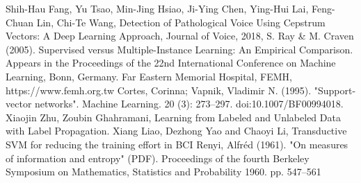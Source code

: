 \documentclass[conference]{IEEEtran}
\begin{document}
\begin{thebibliography}{00}
Shih-Hau Fang, Yu Tsao, Min-Jing Hsiao, Ji-Ying Chen, Ying-Hui Lai, Feng-Chuan Lin, Chi-Te Wang,
Detection of Pathological Voice Using Cepstrum Vectors: A Deep Learning Approach,
Journal of Voice, 2018,
S. Ray \& M. Craven (2005).
Supervised versus Multiple-Instance Learning: An Empirical Comparison.
Appears in the Proceedings of the 22nd International Conference on Machine Learning, Bonn, Germany.
Far Eastern Memorial Hospital, FEMH, https://www.femh.org.tw
Cortes, Corinna; Vapnik, Vladimir N. (1995). "Support-vector networks". Machine Learning. 20 (3): 273–297. doi:10.1007/BF00994018.
Xiaojin Zhu, Zoubin Ghahramani, Learning from Labeled and Unlabeled Data with Label Propagation. 
Xiang Liao, Dezhong Yao and Chaoyi Li, Transductive SVM for reducing the training effort in BCI
Renyi, Alfréd (1961). "On measures of information and entropy" (PDF). Proceedings of the fourth Berkeley Symposium on Mathematics, Statistics and Probability 1960. pp. 547–561
\end{thebibliography}
\end{document}
